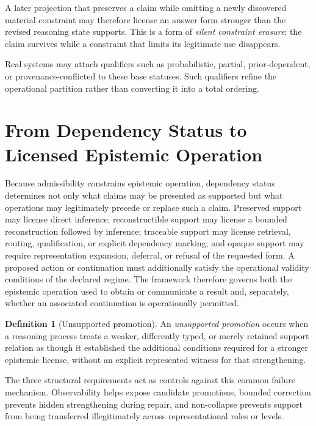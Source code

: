 \documentclass[11pt]{article}
\theoremstyle{definition}
\newtheorem{definition}[proposition]{Definition}
\theoremstyle{remark}
\begin{document}
A later projection that preserves a claim while omitting a newly discovered material constraint may therefore license an answer form stronger than the revised reasoning state supports. This is a form of \emph{silent constraint erasure}: the claim survives while a constraint that limits its legitimate use disappears.

Real systems may attach qualifiers such as probabilistic, partial, prior-dependent, or provenance-conflicted to these base statuses. Such qualifiers refine the operational partition rather than converting it into a total ordering.

\section{From Dependency Status to Licensed Epistemic Operation}

Because admissibility constrains epistemic operation, dependency status determines not only what claims may be presented as supported but what operations may legitimately precede or replace such a claim. Preserved support may license direct inference; reconstructible support may license a bounded reconstruction followed by inference; traceable support may license retrieval, routing, qualification, or explicit dependency marking; and opaque support may require representation expansion, deferral, or refusal of the requested form. A proposed action or continuation must additionally satisfy the operational validity conditions of the declared regime. The framework therefore governs both the epistemic operation used to obtain or communicate a result and, separately, whether an associated continuation is operationally permitted.

\begin{definition}[Unsupported promotion]
\label{def:unsupported-promotion}
An \emph{unsupported promotion} occurs when a reasoning process treats a weaker, differently typed, or merely retained support relation as though it established the additional conditions required for a stronger epistemic license, without an explicit represented witness for that strengthening.
\end{definition}

The three structural requirements act as controls against this common failure mechanism. Observability helps expose candidate promotions, bounded correction prevents hidden strengthening during repair, and non-collapse prevents support from being transferred illegitimately across representational roles or levels.
\end{document}
